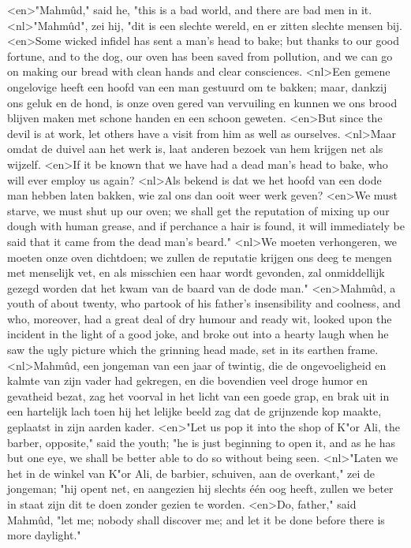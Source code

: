 <en>"Mahmûd," said he, "this is a bad world, and there are bad men in it.
<nl>"Mahmûd", zei hij, "dit is een slechte wereld, en er zitten slechte mensen bij.
<en>Some wicked infidel has sent a man's head to bake; but thanks to our good fortune, and to the dog, our oven has been saved from pollution, and we can go on making our bread with clean hands and clear consciences.
<nl>Een gemene ongelovige heeft een hoofd van een man gestuurd om te bakken; maar, dankzij ons geluk en de hond, is onze oven gered van vervuiling en kunnen we ons brood blijven maken met schone handen en een schoon geweten.
<en>But since the devil is at work, let others have a visit from him as well as ourselves.
<nl>Maar omdat de duivel aan het werk is, laat  anderen bezoek van hem krijgen net als wijzelf.
<en>If it be known that we have had a dead man's head to bake, who will ever employ us again?
<nl>Als bekend is dat we het hoofd van een dode man hebben laten bakken, wie zal ons dan ooit weer werk geven?
<en>We must starve, we must shut up our oven; we shall get the reputation of mixing up our dough with human grease, and if perchance a hair is found, it will immediately be said that it came from the dead man's beard."
<nl>We moeten verhongeren, we moeten onze oven dichtdoen; we zullen de reputatie krijgen ons deeg te mengen met menselijk vet, en als misschien een haar wordt gevonden, zal onmiddellijk gezegd worden dat het kwam van de baard van de dode man."
<en>Mahmûd, a youth of about twenty, who partook of his father's insensibility and coolness, and who, moreover, had a great deal of dry humour and ready wit, looked upon the incident in the light of a good joke, and broke out into a hearty laugh when he saw the ugly picture which the grinning head made, set in its earthen frame.
<nl>Mahmûd, een jongeman van een jaar of twintig, die  de ongevoeligheid en kalmte van zijn vader  had gekregen, en die bovendien veel droge humor en gevatheid bezat, zag het voorval in het licht van een goede grap, en brak uit in een hartelijk lach toen hij het lelijke beeld zag dat de grijnzende kop maakte, geplaatst in zijn aarden kader.
<en>"Let us pop it into the shop of K"or Ali, the barber, opposite," said the youth; "he is just beginning to open it, and as he has but one eye, we shall be better able to do so without being seen.
<nl>"Laten we het in de winkel van K"or Ali, de barbier, schuiven, aan de overkant," zei de jongeman; "hij opent net, en aangezien hij slechts één oog heeft, zullen we beter in staat zijn dit te doen zonder gezien te worden.
<en>Do, father," said Mahmûd, "let me; nobody shall discover me; and let it be done before there is more daylight."
